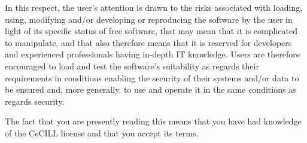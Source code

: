 In this respect, the user's attention is drawn to the risks associated
with loading, using, modifying and/or developing or reproducing the
software by the user in light of its specific status of free software,
that may mean that it is complicated to manipulate, and that also
therefore means that it is reserved for developers and experienced
professionals having in-depth IT knowledge. Users are therefore
encouraged to load and test the software's suitability as regards their
requirements in conditions enabling the security of their systems and/or
data to be ensured and, more generally, to use and operate it in the
same conditions as regards security.

The fact that you are presently reading this means that you have had
knowledge of the CeCILL license and that you accept its terms.


